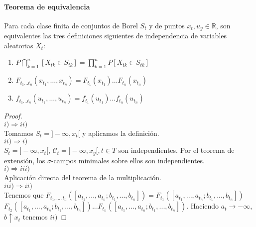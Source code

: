 \paragraph{Teorema de equivalencia}
\begin{theorem}
Para cada clase finita de conjuntos de Borel $S_t$ y de puntos $x_t, u_y \in \mathbb{R}$, son equivalentes las tres definiciones siguientes de independencia de variables aleatorias $X_t$:
\begin{enumerate}
\item $P\bigcap_{k=1}^n [X_{tk}\in S_{tk}]=\displaystyle\prod_{k=1}^n P[X_{tk}\in S_{tk}]$
\item $F_{t_1\ldots t_n}(x_{t_1},\ldots ,x_{t_n})=F_{t_1}(x_{t_1})\ldots F_{t_n}(x_{t_n})$
\item $f_{t_1\ldots t_n}(u_{t_1},\ldots ,u_{t_n})=f_{t_1}(u_{t_1})\ldots f_{t_n}(u_{t_n})$
\end{enumerate}
\end{theorem}
\begin{proof}$\,$\\
$i) \Rightarrow ii)$\\
Tomamos $S_t = ]-\infty, x_t[$ y aplicamos la definición.\\
$ii) \Rightarrow i)$\\
$S_t = ]-\infty, x_t[$,  $\mathcal{C}_t = {]-\infty, x_y[, t \in T}$ 
son independientes. 
Por el teorema de extensión, los $\sigma$-campos minimales sobre ellos son independientes.\\
$i) \Rightarrow iii)$\\
Aplicación directa del teorema de la multiplicación.\\
$iii) \Rightarrow ii)$\\
Tenemos que $F_{t_1,...,t_n}([a_{t_1},...,a_{t_n};b_{t_1},...,b_{t_n}]) = F_{t_1}([a_{t_1},...,a_{t_n};b_{t_1},...,b_{t_n}])$\\$F_{t_2}([a_{t_1},...,a_{t_n};b_{t_1},...,b_{t_n}])...F_{t_n}([a_{t_1},...,a_{t_n};b_{t_1},...,b_{t_n}])$. Haciendo $a_t \rightarrow - \infty$, $b \uparrow x_t$ tenemos $ii)$


\end{proof}

